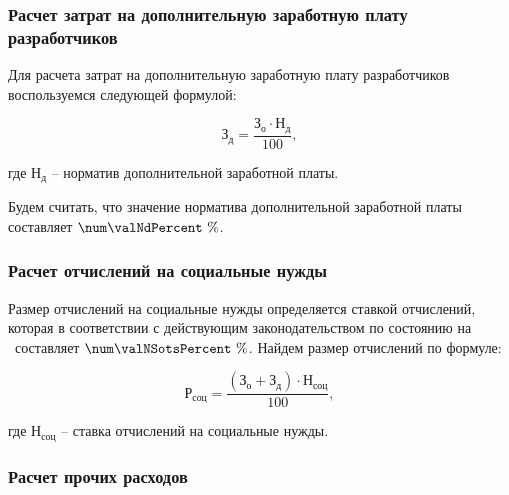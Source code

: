 \fixTableSectionSpace

\subsubsection{Расчет затрат на дополнительную заработную плату разработчиков}


Для расчета затрат на дополнительную заработную плату разработчиков воспользуемся
следующей формулой:

\begin{equation}
  \label{eq:econ:Zd}
  \text{З}_\text{д} = \frac{\text{З}_\text{о} \cdot \text{Н}_\text{д}}
    {100},
\end{equation}
\begin{explanationx}
  \item[где] $ \text{Н}_\text{д} $ -- норматив дополнительной заработной платы.
\end{explanationx}

Будем считать, что значение норматива дополнительной заработной платы составляет
$ \num\valNdPercent \ \% $.


\subsubsection{Расчет отчислений на социальные нужды}


Размер отчислений на социальные нужды определяется ставкой отчислений, которая
в соответствии с действующим законодательством по состоянию на \econCalcDate\
составляет $ \num\valNSotsPercent \ \% $. Найдем размер отчислений по формуле:

\begin{equation}
  \label{eq:econ:RSots}
  \text{Р}_\text{соц} = \frac{(\text{З}_\text{о} + \text{З}_\text{д}) \cdot \text{Н}_\text{соц}}
    {100},
\end{equation}
\begin{explanationx}
  \item[где] $ \text{Н}_\text{соц} $ -- ставка отчислений на социальные нужды.
\end{explanationx}


\subsubsection{Расчет прочих расходов}

